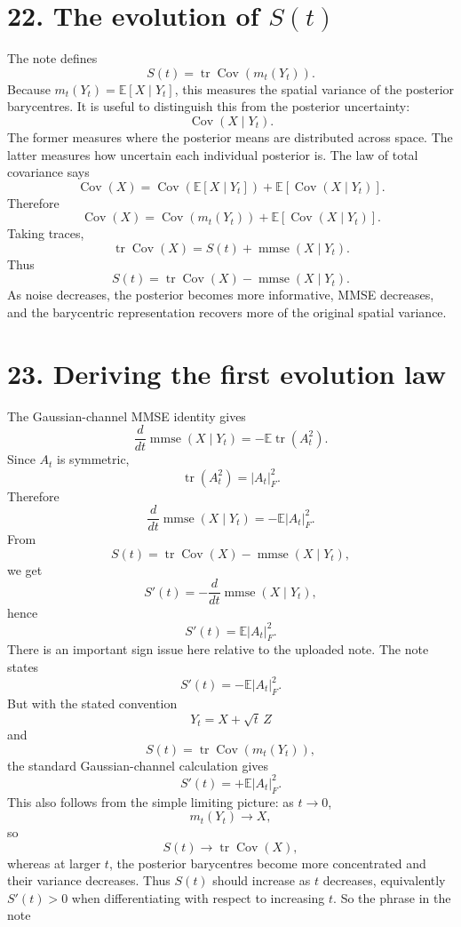 \documentclass{article}
\begin{document}
\section*{22. The evolution of $S(t)$}
The note defines
\[
S(t) = \operatorname{tr} \operatorname{Cov}(m_t(Y_t)).
\]
Because $m_t(Y_t)=\mathbb E[X\mid Y_t]$, this measures the spatial variance of the posterior barycentres.
It is useful to distinguish this from the posterior uncertainty:
\[
\operatorname{Cov}(X\mid Y_t).
\]
The former measures where the posterior means are distributed across space. The latter measures how uncertain each individual posterior is.
The law of total covariance says
\[
\operatorname{Cov}(X) = \operatorname{Cov}(\mathbb E[X\mid Y_t]) + \mathbb E[ \operatorname{Cov}(X\mid Y_t) ].
\]
Therefore
\[
\operatorname{Cov}(X) = \operatorname{Cov}(m_t(Y_t)) + \mathbb E[ \operatorname{Cov}(X\mid Y_t) ].
\]
Taking traces,
\[
\operatorname{tr}\operatorname{Cov}(X) = S(t) + \operatorname{mmse}(X\mid Y_t).
\]
Thus
\[
\boxed{
S(t) = \operatorname{tr}\operatorname{Cov}(X) - \operatorname{mmse}(X\mid Y_t).
}
\]
As noise decreases, the posterior becomes more informative, MMSE decreases, and the barycentric representation recovers more of the original spatial variance.

\section*{23. Deriving the first evolution law}
The Gaussian-channel MMSE identity gives
\[
\frac{d}{dt}\operatorname{mmse}(X\mid Y_t) = -\mathbb E\operatorname{tr}(A_t^2).
\]
Since $A_t$ is symmetric,
\[
\operatorname{tr}(A_t^2) = |A_t|_F^2.
\]
Therefore
\[
\frac{d}{dt}\operatorname{mmse}(X\mid Y_t) = -\mathbb E|A_t|_F^2.
\]
From
\[
S(t) = \operatorname{tr}\operatorname{Cov}(X) - \operatorname{mmse}(X\mid Y_t),
\]
we get
\[
S'(t) = -\frac{d}{dt}\operatorname{mmse}(X\mid Y_t),
\]
hence
\[
\boxed{
S'(t) = \mathbb E|A_t|_F^2.
}
\]
There is an important sign issue here relative to the uploaded note.
The note states
\[
S'(t) = -\mathbb E|A_t|_F^2. \tag{note}
\]
But with the stated convention
\[
Y_t = X + \sqrt{t}\,Z
\]
and
\[
S(t) = \operatorname{tr}\operatorname{Cov}(m_t(Y_t)),
\]
the standard Gaussian-channel calculation gives
\[
\boxed{
S'(t) = +\mathbb E|A_t|_F^2.
}
\]
This also follows from the simple limiting picture: as $t\to0$,
\[
m_t(Y_t)\to X,
\]
so
\[
S(t)\to\operatorname{tr}\operatorname{Cov}(X),
\]
whereas at larger $t$, the posterior barycentres become more concentrated and their variance decreases. Thus $S(t)$ should increase as $t$ decreases, equivalently $S'(t)>0$ when differentiating with respect to increasing $t$.
So the phrase in the note
\end{document}
